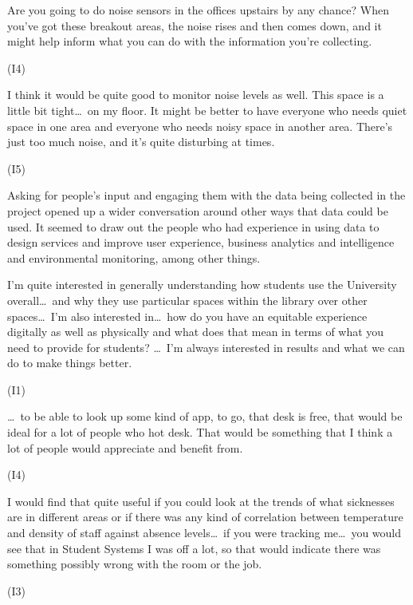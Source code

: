 \begin{qt}Are you going to do noise sensors in the offices upstairs by any
chance? When you’ve got these breakout areas, the noise rises and then
comes down, and it might help inform what you can do with the
information you’re collecting. \end{qt} (I4)

\begin{qt}I think it would be quite good to monitor noise levels as well. This
space is a little bit tight\ldots\  on my floor. It might be better to have
everyone who needs quiet space in one area and everyone who needs
noisy space in another area. There’s just too much noise, and it’s
quite disturbing at times.\end{qt} (I5)

Asking for people’s input and engaging them with the data being
collected in the project opened up a wider conversation around other
ways that data could be used. It seemed to draw out the people who had
experience in using data to design services and improve user
experience, business analytics and intelligence and environmental
monitoring, among other things.

\begin{qt}I’m quite interested in generally understanding how students
  use the University overall\ldots\ and why they use particular spaces
  within the library over other spaces\ldots\ I’m also interested
  in\ldots\ how do you have an equitable experience digitally as well
  as physically and what does that mean in terms of what you need to
  provide for students? \ldots\ I’m always interested in results and
  what we can do to make things better.\end{qt} (I1)

\begin{qt}\ldots\  to be able to look up some kind of app, to go, that desk is free,
that would be ideal for a lot of people who hot desk. That would be
something that I think a lot of people would appreciate and benefit
from.\end{qt} (I4)

\begin{qt}I would find that quite useful if you could look at the trends of
what sicknesses are in different areas or if there was any kind of
correlation between temperature and density of staff against absence
levels\ldots\  if you were tracking me\ldots\ you would see that in Student Systems I was off a lot, so that
would indicate there was something possibly wrong with the room or the
job.\end{qt} (I3)

